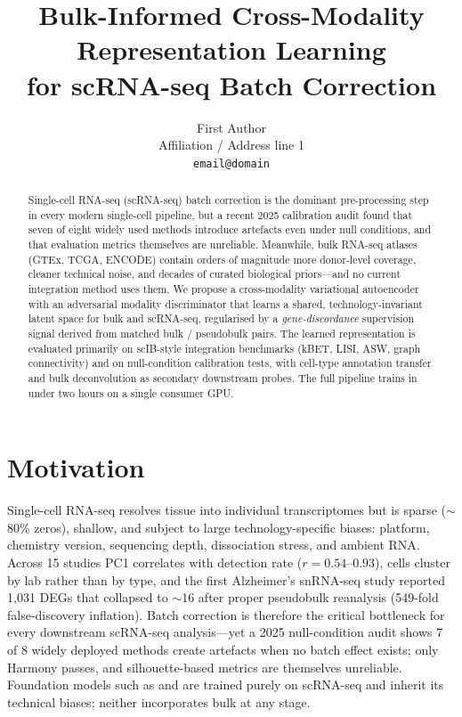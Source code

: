 \documentclass[11pt]{article}
\title{Bulk-Informed Cross-Modality Representation Learning\\
for scRNA-seq Batch Correction}
\author{First Author \\
  Affiliation / Address line 1 \\
  \texttt{email@domain} \\}
\begin{document}
\maketitle
\begin{abstract}
Single-cell RNA-seq (scRNA-seq) batch correction is the dominant
pre-processing step in every modern single-cell pipeline, but a recent 2025
calibration audit found that seven of eight widely used methods introduce
artefacts even under null conditions, and that evaluation metrics themselves
are unreliable. Meanwhile, bulk RNA-seq atlases (GTEx, TCGA, ENCODE) contain
orders of magnitude more donor-level coverage, cleaner technical noise, and
decades of curated biological priors---and no current integration method uses
them. We propose a cross-modality variational autoencoder with an adversarial
modality discriminator that learns a shared, technology-invariant latent space
for bulk and scRNA-seq, regularised by a \emph{gene-discordance}
supervision signal derived from matched bulk / pseudobulk pairs. The learned
representation is evaluated primarily on scIB-style integration benchmarks
(kBET, LISI, ASW, graph connectivity) and on null-condition calibration tests,
with cell-type annotation transfer and bulk deconvolution as secondary
downstream probes. The full pipeline trains in under two hours on a single
consumer GPU.
\end{abstract}

\section{Motivation}

Single-cell RNA-seq resolves tissue into individual transcriptomes but is
sparse ($\sim$80\% zeros), shallow, and subject to large technology-specific
biases: platform, chemistry version, sequencing depth, dissociation stress,
and ambient RNA. Across 15 studies PC1 correlates with detection rate
($r{=}0.54$--$0.93$), cells cluster by lab rather than by type, and the first
Alzheimer's snRNA-seq study reported 1{,}031 DEGs that collapsed to $\sim$16
after proper pseudobulk reanalysis (549-fold false-discovery inflation).
Batch correction is therefore the critical bottleneck for every downstream
scRNA-seq analysis---yet a 2025 null-condition audit shows 7 of 8 widely
deployed methods create artefacts when no batch effect exists; only Harmony
passes, and silhouette-based metrics are themselves unreliable. Foundation
models such as \citet{wen-etal-2024-cellplm} and
\citet{levine-etal-2024-cell2sentence} are trained purely on scRNA-seq and
inherit its technical biases; neither incorporates bulk at any stage.
\end{document}
